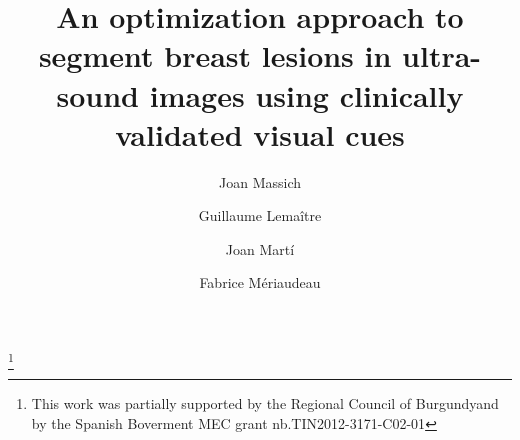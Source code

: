 \title{ An optimization approach to segment breast lesions in ultra-sound images using clinically validated visual cues }


\author{
  Joan Massich \and
  Guillaume Lema\^{i}tre \and
  Joan Mart\'{i} \and
  Fabrice M\'{e}riaudeau
}

\thanks{This work was partially supported by the Regional Council of Burgundyand by the Spanish Boverment MEC grant nb.TIN2012-3171-C02-01}
